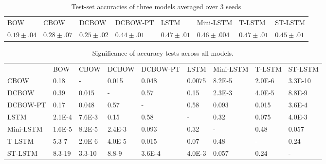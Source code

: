 \begin{table*}[t]
    \centering
    \small
    \begin{tabular}{llllllll}
    BOW  & CBOW & DCBOW & DCBOW-PT & LSTM & Mini-LSTM & T-LSTM & ST-LSTM \\
    $0.19\pm .04$ & $0.28\pm .07$ & $0.25\pm .02$ & $0.44\pm .01$ & $0.47\pm .01$ & $0.46\pm .004$ & $0.47\pm .01$ & $0.45\pm .01$ 
    \end{tabular}
    \label{table: results-acc}
    \caption{Test-set accuracies of three models averaged over 3 seeds}
\end{table*}


\begin{table*}[t]
    \small
    \begin{tabular}{lllllllll}
                     & BOW     & CBOW     & DCBOW  & DCBOW-PT   & LSTM    &
                     Mini-LSTM & T-LSTM & ST-LSTM \\
        CBOW         & 0.18  &   -   & 0.015  & 0.048 &0.0075&8.2E-5 & 2.0E-6 &3.3E-10     \\
        DCBOW    & 0.39   &  0.015   &  -    &  0.57  & 0.15  & 2.3E-3  & 4.0E-5 & 8.8E-9     \\
        DCBOW-PT & 0.17  &   0.048  &   0.57  &   -  &  0.58 &  0.093  &   0.015  & 3.6E-4 \\
        LSTM         & 2.1E-4 &  7.6E-3 &  0.15  &  0.58 & -  &  0.32  &  0.075  & 4.0E-3      \\
        Mini-LSTM    & 1.6E-5 &  8.2E-5 &  2.4E-3  &  0.093  &  0.32  &   -    &    0.48   &  0.057     \\
        T-LSTM    & 5.3-7  & 2.0E-6 & 4.0E-5 &  0.015  & 0.07  &   0.48   &    -    &   0.24     \\
        ST-LSTM & 8.3-19  &  3.3-10  &  8.8-9  & 3.6E-4 & 4.0E-3 &  0.057   &    0.24   &   -       
        \end{tabular}
    \label{table: sign}
    \caption{Significance of accuracy tests across all models.}
\end{table*}